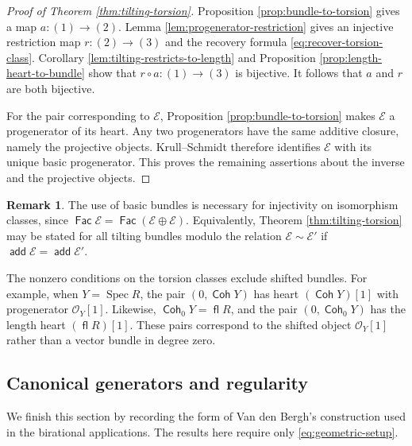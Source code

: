 \documentclass[a4paper,reqno]{amsart}
\def\E{\mathcal{E}}
\def\O{\mathcal{O}}
\DeclareMathOperator{\fl}{\mathsf{fl}}
\DeclareMathOperator{\add}{\mathsf{add}}
\DeclareMathOperator{\Fac}{\mathsf{Fac}}
\DeclareMathOperator{\Coh}{\mathsf{Coh}}
\DeclareMathOperator{\Spec}{Spec}
\theoremstyle{definition}
\newtheorem{Rem}[Thm]{Remark}
\begin{document}
\begin{proof}[Proof of Theorem \ref{thm:tilting-torsion}]
Proposition \ref{prop:bundle-to-torsion} gives a map $a\colon(1)\to(2)$. Lemma \ref{lem:progenerator-restriction} gives an injective restriction map $r\colon(2)\to(3)$ and the recovery formula \eqref{eq:recover-torsion-class}. Corollary \ref{lem:tilting-restricts-to-length} and Proposition \ref{prop:length-heart-to-bundle} show that $r\circ a\colon(1)\to(3)$ is bijective. It follows that $a$ and $r$ are both bijective.

For the pair corresponding to $\E$, Proposition \ref{prop:bundle-to-torsion} makes $\E$ a progenerator of its heart. Any two progenerators have the same additive closure, namely the projective objects. Krull--Schmidt therefore identifies $\E$ with its unique basic progenerator. This proves the remaining assertions about the inverse and the projective objects.
\end{proof}

\begin{Rem}
The use of basic bundles is necessary for injectivity on isomorphism classes, since $\Fac\E=\Fac(\E\oplus\E)$. Equivalently, Theorem \ref{thm:tilting-torsion} may be stated for all tilting bundles modulo the relation $\E\sim\E'$ if $\add\E=\add\E'$.

The nonzero conditions on the torsion classes exclude shifted bundles. For example, when $Y=\Spec R$, the pair $(0,\Coh Y)$ has heart $(\Coh Y)[1]$ with progenerator $\O_Y[1]$. Likewise, $\Coh_0Y=\fl R$, and the pair $(0,\Coh_0Y)$ has the length heart $(\fl R)[1]$. These pairs correspond to the shifted object $\O_Y[1]$ rather than a vector bundle in degree zero.
\end{Rem}

\subsection{Canonical generators and regularity}\label{sec:canonical-generators}

We finish this section by recording the form of Van den Bergh's construction used in the birational applications. The results here require only \eqref{eq:geometric-setup}.
\end{document}
